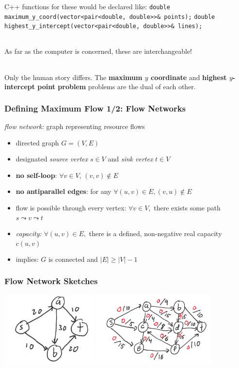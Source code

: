 \documentclass{beamer}
\newcommand{\stanza}{ \\~\ }
\begin{document}
\begin{frame} \frametitle{}
C++ functions for these would be declared like:
\lstinline!double maximum_y_coord(vector<pair<double, double>>& points);!
\lstinline!double highest_y_intercept(vector<pair<double, double>>& lines);! \stanza

As far as the computer is concerned, these are interchangeable! \stanza

Only the human story differs.
The
\textbf{maximum $y$ coordinate}
and
\textbf{highest $y$-intercept point problem}
problems are the dual of each other.
\end{frame}

\begin{frame} \frametitle{Defining Maximum Flow 1/2: Flow Networks}
\emph{flow network:} graph representing resource flows
\begin{itemize}
  \item directed graph $G=(V, E)$
  \item designated \emph{source vertex} $s \in V$ and \emph{sink vertex} $t \in V$
  \item \textbf{no self-loop}: $\forall v \in V$, $(v, v) \notin E$
  \item \textbf{no antiparallel edges}: for any $\forall (u, v) \in E, (v, u) \notin E$
  \item flow is possible through every vertex: $\forall v \in V,$ there exists
    some path $s \leadsto v \leadsto t$
  \item \emph{capacity:} $\forall (u, v) \in E,$ there is a defined,
    non-negative real capacity $c(u, v)$
  \item implies: $G$ is connected and $|E| \geq |V|-1$
\end{itemize}
\end{frame}

\begin{frame} \frametitle{Flow Network Sketches}
\begin{center}
  \includegraphics[height=1.5in]{flownetwork-1.png} \includegraphics[height=1.5in]{flownetwork-2.png}
\end{center}
\end{frame}
\end{document}
